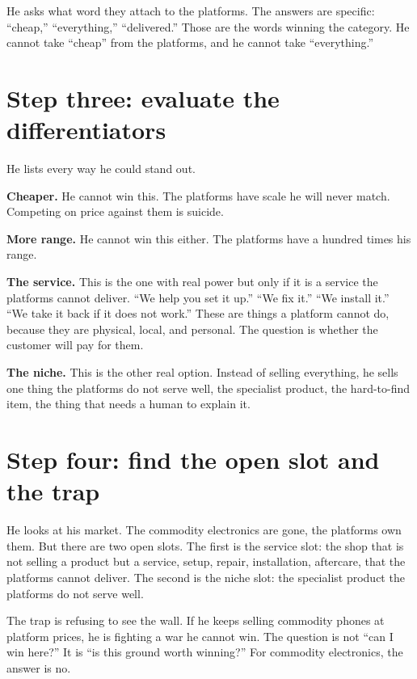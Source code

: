 \documentclass[10pt,twoside,openany]{memoir}
\newcommand{\needspacehead}{\needspace{4\baselineskip}}
\let\oldsection\section
\renewcommand{\section}{\needspacehead\oldsection}
\begin{document}
{He asks what word they attach to the platforms. The answers are
specific: ``cheap,'' ``everything,'' ``delivered.'' Those are the words
winning the category. He cannot take ``cheap'' from the platforms, and
he cannot take ``everything.''

\section{Step three: evaluate the
differentiators}\label{step-three-evaluate-the-differentiators-2}

He lists every way he could stand out.

\textbf{Cheaper.} He cannot win this. The platforms have scale he will
never match. Competing on price against them is suicide.

\textbf{More range.} He cannot win this either. The platforms have a
hundred times his range.

\textbf{The service.} This is the one with real power but only if it is
a service the platforms cannot deliver. ``We help you set it up.'' ``We
fix it.'' ``We install it.'' ``We take it back if it does not work.''
These are things a platform cannot do, because they are physical, local,
and personal. The question is whether the customer will pay for them.

\textbf{The niche.} This is the other real option. Instead of selling
everything, he sells one thing the platforms do not serve well, the
specialist product, the hard-to-find item, the thing that needs a human
to explain it.

\section{Step four: find the open slot and the
trap}\label{step-four-find-the-open-slot-and-the-trap-2}

He looks at his market. The commodity electronics are gone, the
platforms own them. But there are two open slots. The first is the
service slot: the shop that is not selling a product but a service,
setup, repair, installation, aftercare, that the platforms cannot
deliver. The second is the niche slot: the specialist product the
platforms do not serve well.

The trap is refusing to see the wall. If he keeps selling commodity
phones at platform prices, he is fighting a war he cannot win. The
question is not ``can I win here?'' It is ``is this ground worth
winning?'' For commodity electronics, the answer is no.

}
\end{document}
